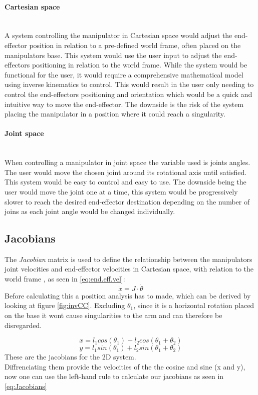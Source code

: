   \paragraph{Cartesian space}\\
  A system controlling the manipulator in Cartesian space would adjust the end-effector position in relation to a pre-defined world frame, often placed on the manipulators base. This system would use the user input to adjust the end-effectors positioning in relation to the world frame. While the system would be functional for the user, it would require a comprehensive mathematical model using inverse kinematics to control. This would result in the user only needing to control the end-effectors positioning and orientation which would be a quick and intuitive way to move the end-effector. The downside is the risk of the system placing the manipulator in a position where it could reach a singularity. 
  \paragraph{Joint space}\\
  When controlling a manipulator in joint space the variable used is joints angles. The user would move the chosen joint around its rotational axis until satisfied. This system would be easy to control and easy to use. The downside being the user would move the joint one at a time, this system would be progressively slower to reach the desired end-effector destination depending on the number of joins as each joint angle would be changed individually. 
  
 \subsection*{Jacobians}
The \textit{Jacobian} matrix is used to define the relationship between the manipulators joint velocities and end-effector velocities in Cartesian space, with relation to the world frame \cite{ShaopingLN}, as seen in \ref{eq:end.eff.vel}:
\begin{equation}\label{eq:end.eff.vel}
    \dot x = J \cdot \dot{\theta}
\end{equation}
Before calculating this a position analysis has to made, which can be derived by looking at figure \ref{fig:invCC}. Excluding $\theta_1$, since it is a horizontal rotation placed on the base it wont cause singularities to the arm and can therefore be disregarded. 

\begin{equation}
    x=l_1cos(\theta_1)+l_2cos(\theta_1 + \theta_2)
\end{equation}
\begin{equation}
    y=l_1sin(\theta_1)+l_2sin(\theta_1 + \theta_2)
\end{equation}
These are the jacobians for the 2D system.\\
Diffrenciating them provide the velocities of the the cosine and sine (x and y), now one can use the left-hand rule to calculate our jacobians as seen in \ref{eq:Jacobians}


